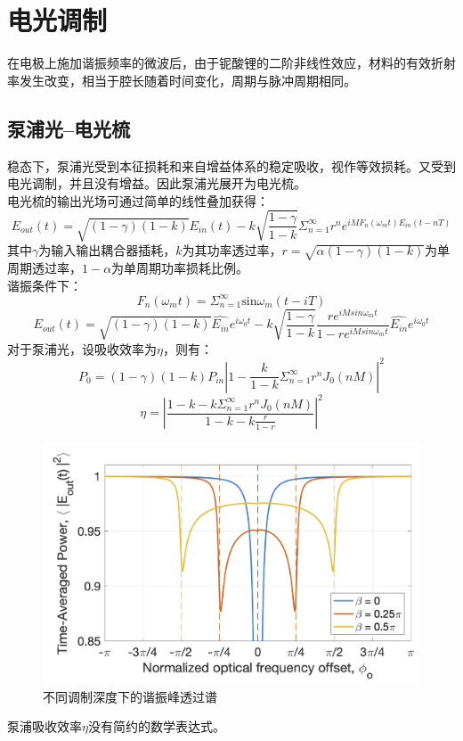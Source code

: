 \section{电光调制}
在电极上施加谐振频率的微波后，由于铌酸锂的二阶非线性效应，材料的有效折射率发生改变，相当于腔长随着时间变化，周期与脉冲周期相同。
\subsection{泵浦光--电光梳}
稳态下，泵浦光受到本征损耗和来自增益体系的稳定吸收，视作等效损耗。又受到电光调制，并且没有增益。因此泵浦光展开为电光梳。\\
电光梳的输出光场可通过简单的线性叠加获得：
\[E_{out}(t) = \sqrt{(1-\gamma)(1-k)} E_{in}(t) - k\sqrt{\frac{1-\gamma}{1-k}} \Sigma_{n=1}^{\infty}r^n e^{iMF_n(\omega_m t) E_{in}(t-nT)}\]
其中$\gamma$为输入输出耦合器插耗，$k$为其功率透过率，$r=\sqrt{\alpha(1-\gamma)(1-k)}$为单周期透过率，$1-\alpha$为单周期功率损耗比例。\\
谐振条件下：
\[F_n(\omega_m t) = \Sigma_{n=1}^{\infty} \mathrm{sin}\omega_m(t-iT)\]
\[E_{out}(t) = \sqrt{(1-\gamma)(1-k)} \hat{E_{in}}e^{i\omega_0 t} - k\sqrt{\frac{1-\gamma}{1-k}} \frac{r e^{iMsin\omega_m t}}{1-r e^{iMsin\omega_m t}} \hat{E_{in}}e^{i\omega_0 t}\]
对于泵浦光，设吸收效率为$\eta$，则有：
\[P_0 = (1-\gamma)(1-k)P_{in} |1-\frac{k}{1-k}\Sigma_{n=1}^{\infty}r^n J_0(nM)|^2\]
\[\eta = |\frac{1-k-k\Sigma_{n=1}^{\infty}r^n J_0(nM)}{1-k-k\frac{r}{1-r}}|^2\]
\begin{figure}[htbp]
    \centering
    \includegraphics[width=0.8\linewidth]{figure/fig_11.png}
    \caption{不同调制深度下的谐振峰透过谱}
    \label{fig:enter-label}
\end{figure}
泵浦吸收效率$\eta$没有简约的数学表达式。
